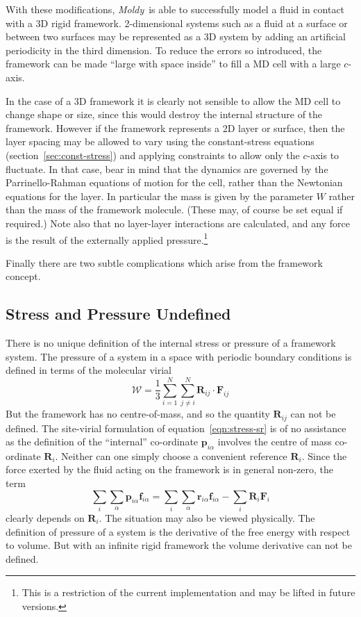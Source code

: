\documentclass[a4paper,twoside]{report}
\providecommand{\bm}[1]{\mathbf{#1}}
\newcommand{\moldy}{\emph{Moldy}}
\begin{document}
With these modifications, \moldy\ is able to successfully model a fluid
in contact with a 3D rigid framework. 2-dimensional systems such as a
fluid at a surface or between two surfaces may be represented as a 3D
system by adding an artificial periodicity in the third dimension. To
reduce the errors so introduced, the framework can be made ``large
with space inside'' to fill a MD cell with a large $c$-axis.  

In the case of a 3D framework it is clearly not sensible to allow the
MD cell to change shape or size, since this would destroy the internal
structure of the framework.  However if the framework represents a 2D
layer or surface, then the layer spacing may be allowed to vary using
the constant-stress equations (section~\ref{sec:const-stress}) and
applying constraints to allow only the $c$-axis to fluctuate.  In that
case, bear in mind that the dynamics are governed by the
Parrinello-Rahman equations of motion for the cell, rather than the
Newtonian equations for the layer.  In particular the mass is given by
the parameter $W$ rather than the mass of the framework molecule.
(These may, of course be set equal if required.)  Note also that no
layer-layer interactions are calculated, and any force is the result
of the externally applied pressure.\footnote{This is a restriction of
  the current implementation and may be lifted in future versions.}

Finally there are two subtle complications which arise from the
framework concept.

\subsection{Stress and Pressure Undefined}
There is no unique definition of the internal stress or pressure of a
framework system.    The pressure of a system in a space with periodic
boundary conditions  is defined in terms of the molecular virial
\begin{equation}
\label{eqn:virial}
\mathcal{W} = \frac{1}{3} \sum_{i=1}^N \sum_{j \neq i}^N \bm{R}_{ij}
\cdot \bm{F}_{ij}
\end{equation}
But the framework has no centre-of-mass, and so the quantity
$\bm{R}_{ij}$ can not be defined.  The site-virial formulation of
equation~\ref{eqn:stress-sr} is of no assistance as the definition of the
``internal'' co-ordinate $\bm{p}_{i\alpha}$ involves the centre of
mass co-ordinate $\bm{R}_i$.  Neither can one simply choose a
convenient reference $\bm{R}_i$.  Since the force exerted by the fluid
acting on the framework is in general non-zero, the term
\begin{equation}
\sum_i \sum_\alpha \bm{p}_{i\alpha} \bm{f}_{i\alpha}
= \sum_i \sum_\alpha \bm{r}_{i\alpha} \bm{f}_{i\alpha}
- \sum_i \bm{R}_i \bm{F}_i
\end{equation}
clearly depends on $\bm{R}_i$.  The situation may also be viewed
physically.  The definition of pressure of a system is the derivative
of the free energy with respect to volume.  But with an infinite rigid
framework the volume derivative can not be defined.
\end{document}
